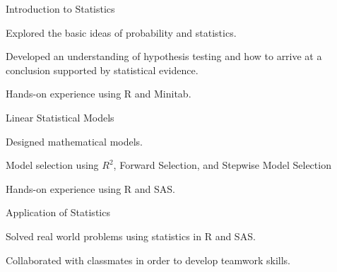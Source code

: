 

\begin{cventries}

  \cventry
    {Introduction to Statistics} %
    {} %
    {} %
    {} %
    {
    \begin{cvitems}
    \item Explored the basic ideas of probability and statistics.
    \item Developed an understanding of hypothesis testing and how to arrive at a conclusion supported by statistical evidence.
    \item Hands-on experience using R and Minitab.
    \end{cvitems}
    }

  \cventry
    {Linear Statistical Models} %
    {} %
    {} %
    {} %
    {
      \begin{cvitems}
      \item Designed mathematical models.
      \item Model selection using $R^2$, Forward Selection, and Stepwise Model Selection
      \item Hands-on experience using R and SAS.
      \end{cvitems}
    }

      \cventry
    {Application of Statistics} %
    {} %
    {} %
    {} %
    {
      \begin{cvitems}
      \item Solved real world problems using statistics in R and SAS.
        \item Collaborated with classmates in order to develop teamwork skills.
      \end{cvitems}
    }
\end{cventries}
